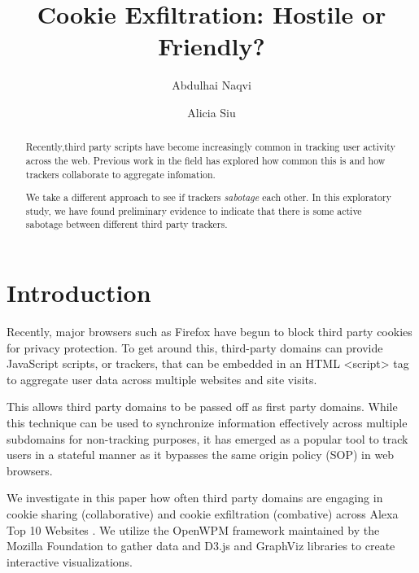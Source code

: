 \documentclass[sigplan,screen]{acmart}
\begin{document}
\title{Cookie Exfiltration: Hostile or Friendly?}


\author{Abdulhai Naqvi}

\author{Alicia Siu}



\begin{abstract}
Recently,third party scripts have become increasingly common in tracking user activity across the web. Previous work in the field has explored how common this is and how trackers collaborate to aggregate infomation. 

We take a different approach to see if trackers \textit{sabotage} each other. In this exploratory study, we have found preliminary evidence to indicate that there is some active sabotage between different third party trackers. 


\end{abstract}

\maketitle

\section{Introduction}

Recently, major browsers such as Firefox have begun to block third party cookies for privacy protection\cite{firefox}. To get around this, third-party domains can provide JavaScript scripts, or trackers, that can be embedded in an HTML <script> tag to aggregate user data across multiple websites and site visits.

This allows third party domains to be passed off as first party domains.  While this technique can be used to synchronize information effectively across multiple subdomains for non-tracking purposes, it has emerged as a popular tool to track users in a stateful manner\cite{chen2021cookie}\cite{englehardt2016census} as it bypasses the same origin policy (SOP) in web browsers.

We investigate in this paper how often third party domains are engaging in cookie sharing (collaborative) and cookie exfiltration (combative) across Alexa Top 10 Websites \cite{alexa}. We utilize the OpenWPM framework maintained by the Mozilla Foundation \cite{englehardt2016census} to gather data and D3.js\cite{d3js} and GraphViz\cite{graphviz} libraries to create interactive visualizations. 
\end{document}
